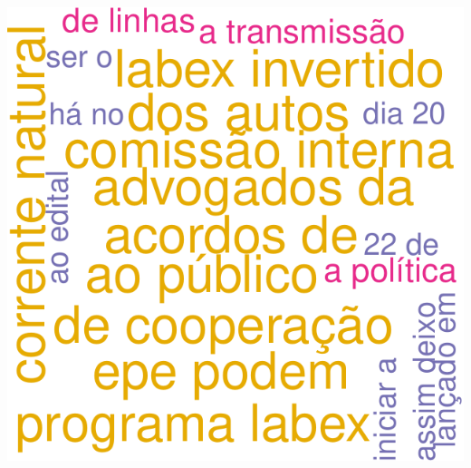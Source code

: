 \documentclass[]{article}
\begin{document}
\includegraphics{markdown_v31_files/figure-latex/wordcloud_onegram_DIR05_semstopwords-1.pdf}
\end{document}
